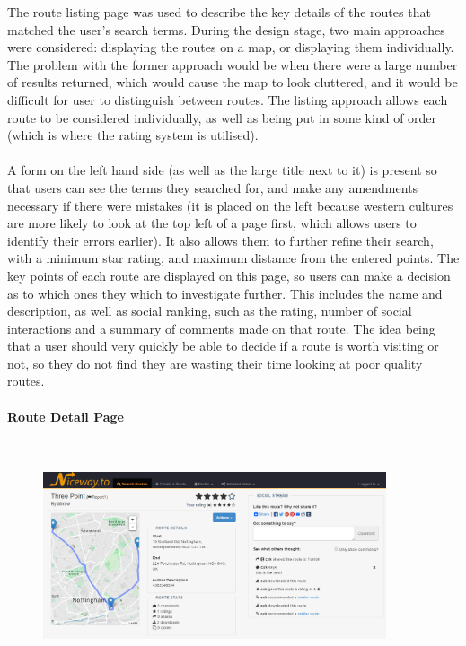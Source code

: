 \noindent 
The route listing page was used to describe the key details of the routes that matched the user's search terms. During the design stage, two main approaches were considered: displaying the routes on a map, or displaying them individually. The problem with the former approach would be when there were a large number of results returned, which would cause the map to look cluttered, and it would be difficult for user to distinguish between routes. The listing approach allows each route to be considered individually, as well as being put in some kind of order (which is where the rating system is utilised). \ \\
\ \\
A form on the left hand side (as well as the large title next to it) is present so that users can see the terms they searched for, and make any amendments necessary if there were mistakes (it is placed on the left because western cultures are more likely to look at the top left of a page first\cite{mccarthy2004could}, which allows users to identify their errors earlier). It also allows them to further refine their search, with a minimum star rating, and maximum distance from the entered points. The key points of each route are displayed on this page, so users can make a decision as to which ones they which to investigate further. This includes the name and description, as well as social ranking, such as the rating, number of social interactions and a summary of comments made on that route. The idea being that a user should very quickly be able to decide if a route is worth visiting or not, so they do not find they are wasting their time looking at poor quality routes.

\paragraph{Route Detail Page}\ \\
\begin{figure}[!ht]
	\vspace{-6mm}
	\begin{center}
		\includegraphics[width=0.9\textwidth]{images/design/detail.png}
	\end{center}
	\vspace{-8mm}
\end{figure}

